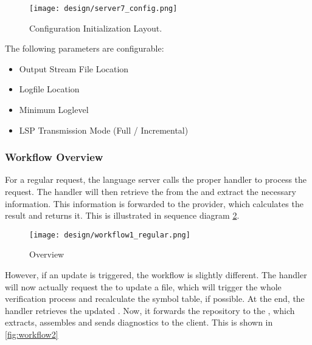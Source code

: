 \begin{figure}[H]
    \centering
    \texttt{[image: design/server7\_config.png]}
    \caption{Configuration Initialization Layout.}
    \label{fig:server_config}
\end{figure}

The following parameters are configurable:
\begin{itemize}
    \item Output Stream File Location
    \item Logfile Location
    \item Minimum Loglevel
    \item LSP Transmission Mode (Full / Incremental)
\end{itemize}


\subsubsection{Workflow Overview}
For a regular request, the language server calls the proper handler to process the request.
The handler will then retrieve the  from the  and extract the necessary information.
This information is forwarded to the provider, which calculates the result and returns it.
This is illustrated in sequence diagram \ref{fig:workflow1}.

\begin{figure}[H]
    \centering
    \texttt{[image: design/workflow1\_regular.png]}
    \caption{Overview}
    \label{fig:workflow1}
\end{figure}


However, if an update is triggered, the workflow is slightly different.
The handler will now actually request the  to update a file, which will trigger the whole verification process and recalculate the symbol table, if possible.
At the end, the handler retrieves the updated .
Now, it forwards the repository to the , which extracts, assembles and sends diagnostics to the client.
This is shown in \ref{fig:workflow2}

